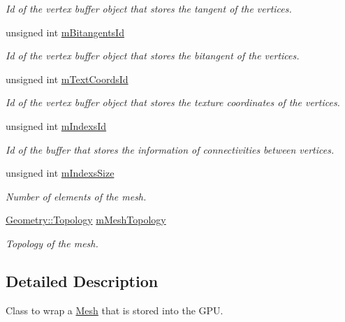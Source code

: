 \begin{DoxyCompactItemize}
\begin{DoxyCompactList}\small\item\em Id of the vertex buffer object that stores the tangent of the vertices. \end{DoxyCompactList}\item 
unsigned int \hyperlink{class_g_p_u_geometry_ac5f70882b315385c4abd8e13c7d87c06}{m\+Bitangents\+Id}
\begin{DoxyCompactList}\small\item\em Id of the vertex buffer object that stores the bitangent of the vertices. \end{DoxyCompactList}\item 
unsigned int \hyperlink{class_g_p_u_geometry_a47934d33be572e934ab7a06fbc822485}{m\+Text\+Coords\+Id}
\begin{DoxyCompactList}\small\item\em Id of the vertex buffer object that stores the texture coordinates of the vertices. \end{DoxyCompactList}\item 
unsigned int \hyperlink{class_g_p_u_geometry_a7528dbd5d745121f03c093adfa8aa9bc}{m\+Indexs\+Id}
\begin{DoxyCompactList}\small\item\em Id of the buffer that stores the information of connectivities between vertices. \end{DoxyCompactList}\item 
unsigned int \hyperlink{class_g_p_u_geometry_a6dea12bd5a55b4f98b97cc77f0b1a6f3}{m\+Indexs\+Size}
\begin{DoxyCompactList}\small\item\em Number of elements of the mesh. \end{DoxyCompactList}\item 
\hyperlink{class_geometry_af0136a3b268286ee5921cc6af5239293}{Geometry\+::\+Topology} \hyperlink{class_g_p_u_geometry_a50c7b109148ff6a5218903bf7e848be3}{m\+Mesh\+Topology}
\begin{DoxyCompactList}\small\item\em Topology of the mesh. \end{DoxyCompactList}\end{DoxyCompactItemize}


\subsection{Detailed Description}
Class to wrap a \hyperlink{class_mesh}{Mesh} that is stored into the G\+P\+U. 

